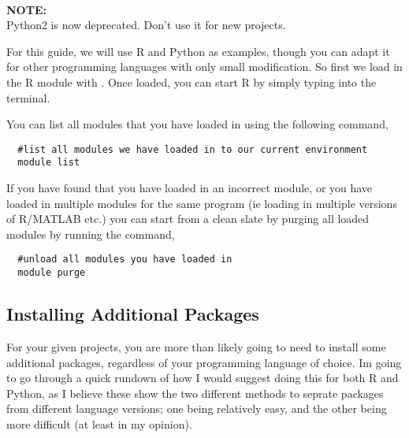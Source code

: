 %
\\
\par
%
\begin{story}
  \textbf{NOTE:}
  \\
  Python2 is now deprecated. Don't use it for new projects.
\end{story}
%
%
For this guide, we will use R and Python as examples, though you can adapt it for other programming languages with only small modification. So first we load in the R module with . Once loaded, you can start R by simply typing  into the terminal.
%
%
%
\par
You can list all modules that you have loaded in using the following command,
\\
\par
\begin{verbatim}
  #list all modules we have loaded in to our current environment
  module list
\end{verbatim}

If you have found that you have loaded in an incorrect module, or you have loaded in multiple modules for the same program (ie loading in multiple versions of R/MATLAB etc.) you can start from a clean slate by purging all loaded modules by running the command,
%
\\
\par
\begin{verbatim}
  #unload all modules you have loaded in
  module purge
\end{verbatim}
%
%
%
\subsection{Installing Additional Packages}
%
%
For your given projects, you are more than likely going to need to install some additional packages, regardless of your programming language of choice.
Im going to go through a quick rundown of how I would suggest doing this for both R and Python, as I believe these show the two different methods to seprate packages from different language versions; one being relatively easy, and the other being more difficult (at least in my opinion).
%
%
